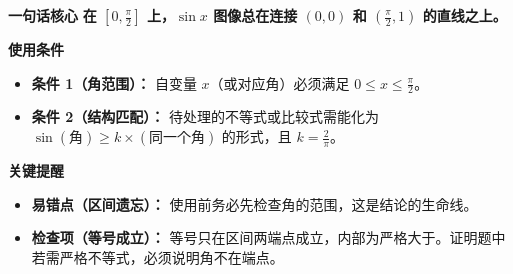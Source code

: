 \begin{summarybox}
\textbf{\textcolor{CSummary}{一句话核心}}
\textbf{在 $[0,\frac{\pi}{2}]$ 上，$\sin x$ 图像总在连接 $(0,0)$ 和 $(\frac{\pi}{2},1)$ 的直线之上。}

\medskip
\textbf{\textcolor{CSummary}{使用条件}}
\begin{itemize}[leftmargin=*, itemsep=0.5em, topsep=0.4em]
    \item \textbf{条件 1（角范围）：} 自变量 $x$（或对应角）必须满足 $0 \leq x \leq \frac{\pi}{2}$。
    \item \textbf{条件 2（结构匹配）：} 待处理的不等式或比较式需能化为 $\sin(\text{角}) \geq k \times (\text{同一个角})$ 的形式，且 $k=\frac{2}{\pi}$。
\end{itemize}

\medskip
\textbf{\textcolor{CSummary}{关键提醒}}
\begin{itemize}[leftmargin=*, itemsep=0.5em, topsep=0.4em]
    \item \textbf{易错点（区间遗忘）：} 使用前务必先检查角的范围，这是结论的生命线。
    \item \textbf{检查项（等号成立）：} 等号只在区间两端点成立，内部为严格大于。证明题中若需严格不等式，必须说明角不在端点。
\end{itemize}
\end{summarybox}
